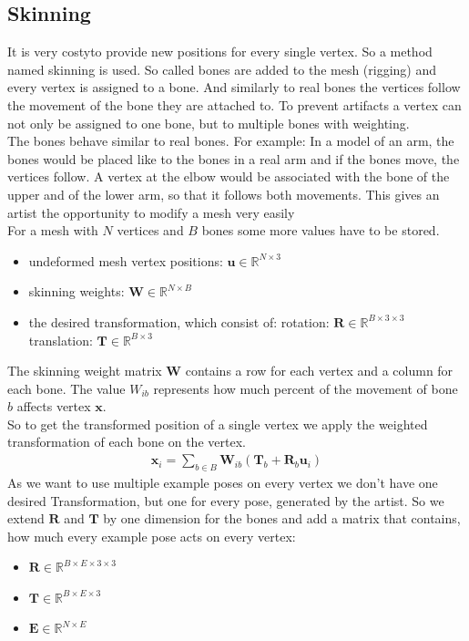 \subsection{Skinning}
	It is very costyto provide new positions for every single vertex. So a method named skinning is used. So called bones are added to the mesh (rigging) and every vertex is assigned to a bone. And similarly to real bones the vertices follow the movement of the bone they are attached to. To prevent artifacts a vertex can not only be assigned to one bone, but to multiple bones with weighting. \\
	The bones behave similar to real bones. For example: In a model of an arm, the bones would be placed like to the bones in a real arm and if the bones move, the vertices follow. A vertex at the elbow would be associated with the bone of the upper and of the lower arm, so that it follows both movements. This gives an artist the opportunity to modify a mesh very easily \\
	For a mesh with $N$ vertices and $B$ bones some more values have to be stored.
\begin{itemize}
	\item undeformed mesh vertex positions: $\bm{u} \in \mathbb{R}^{N \times 3}$	
	\item skinning weights: $\bm{W} \in \mathbb{R} ^{N \times B}$
	\item the desired transformation, which consist of:
		\subitem rotation: $\bm{R} \in \mathbb{R}^{B\times 3\times 3}$
		\subitem translation: $\bm{T}\in \mathbb{R}^{B\times 3}$
\end{itemize}
	The skinning weight matrix $\bm{W}$ contains a row for each vertex and a column for each bone. The value $W_{ib}$ represents how much percent of the movement of bone $b$ affects vertex $\bm x$.\\
	So to get the transformed position of a single vertex we apply the weighted transformation of each bone on the vertex.
\begin{align}
\bm{x}_i =\sum_{b\in B} \bm{W}_{ib}\left(\bm{T}_b +\bm{R}_b \bm{u}_i\right)
\end{align}
As we want to use multiple example poses on every vertex we don't have one desired Transformation, but one for every pose, generated by the artist. So we extend $\bm{R}$ and $\bm{T}$ by one dimension for the bones and add a matrix that contains, how much every example pose acts on every vertex:
\begin{itemize}
	\item $\bm {R}\in\mathbb{R}^{B\times E\times 3\times 3}$
	\item $\bm {T}\in \mathbb{R}^{B\times E\times 3}$
	\item $\bm{E}\in \mathbb{R}^{N \times E}$
\end{itemize}

